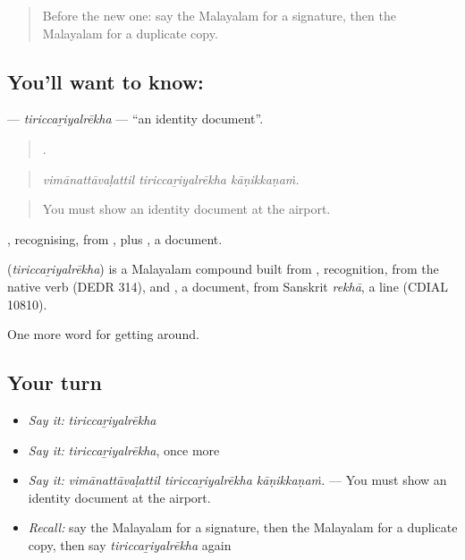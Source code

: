 \label{lesson:ML-C488-tiriccariyalrekha}



\begin{quote}
Before the new one: say the Malayalam for a signature, then the Malayalam for a duplicate copy.
\end{quote}

\subsection*{You'll want to know: }
\textbf{} — \emph{tiriccaṟiyalrēkha} — \textquotedblleft{}an identity document\textquotedblright{}.

\begin{quote}
  .
\end{quote}

\begin{quote}
\emph{vimānattāvaḷattil tiriccaṟiyalrēkha kāṇikkaṇaṁ.}
\end{quote}

\begin{quote}
You must show an identity document at the airport.
\end{quote}

, recognising, from , plus , a document.

\begin{cousinweb}
\textbf{} (\emph{tiriccaṟiyalrēkha}) is a Malayalam compound built from , recognition, from the native verb  (DEDR 314), and , a document, from Sanskrit \emph{rekhā}, a line (CDIAL 10810).
\end{cousinweb}

\begin{grammarlens}[title={What you've built}]
One more word for getting around.
\end{grammarlens}

\subsection*{Your turn}
\begin{itemize}
\raggedright
  \item \emph{Say it:} \emph{tiriccaṟiyalrēkha}
  \item \emph{Say it:} \emph{tiriccaṟiyalrēkha}, once more
  \item \emph{Say it:} \emph{vimānattāvaḷattil tiriccaṟiyalrēkha kāṇikkaṇaṁ.} — You must show an identity document at the airport.
  \item \emph{Recall:} say the Malayalam for a signature, then the Malayalam for a duplicate copy, then say \emph{tiriccaṟiyalrēkha} again
\end{itemize}

